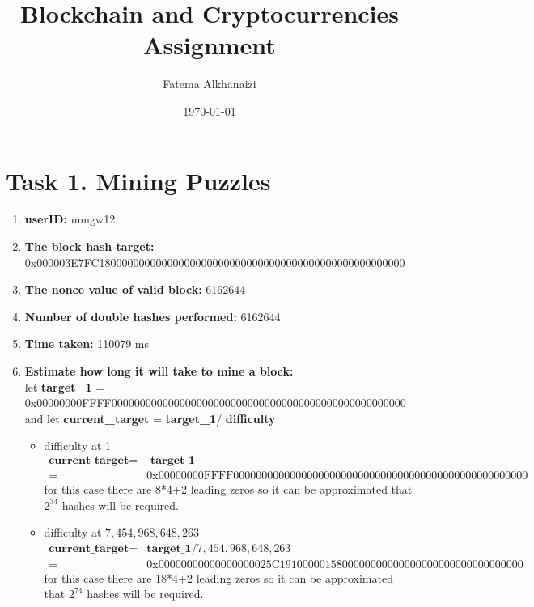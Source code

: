 \documentclass[11pt]{article}
\title{Blockchain and Cryptocurrencies Assignment}
\author{Fatema Alkhanaizi}
\date{\today}
\begin{document}
    \maketitle 
    \section*{Task 1. Mining Puzzles}
    \begin{enumerate}
        \item \textbf{userID:} mmgw12
        \item \textbf{The block hash target:} 0x000003E7FC180000000000000000000000000000000000000000000000000000
        \item \textbf{The nonce value of valid block:} 6162644
        \item \textbf{Number of double hashes performed:} 6162644
        \item \textbf{Time taken:} 110079 ms
        \item \textbf{Estimate how long it will take to mine a block:} \\
        let \textbf{target\_1} = 0x00000000FFFF0000000000000000000000000000000000000000000000000000
        and let \textbf{current\_target} = \textbf{target\_1}/ \textbf{difficulty}
        \begin{itemize}
            \item difficulty at 1
            \begin{align*}
\textbf{current\_target} =& \textbf{ target\_1}\\
                         =&   \text{0x00000000FFFF0000000000000000000000000000000000000000000000000000}
            \end{align*}
            for this case there are 8*4+2 leading zeros so it can be approximated that $2^{34}$ hashes will be required. 
            \item difficulty at $7,454,968,648,263$
            \begin{align*}
                \textbf{current\_target} =& \textbf{target\_1} / 7,454,968,648,263 \\
                                         =&   \text{0x00000000000000000025C1910000015800000000000000000000000000000000}
                            \end{align*}
            for this case there are 18*4+2 leading zeros so it can be approximated that $2^{74}$ hashes will be required. 
        \end{itemize}
        
        
        
    \end{enumerate}
\end{document}
